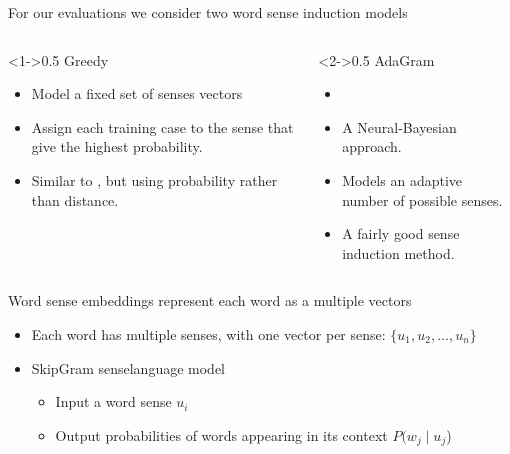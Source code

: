 \documentclass[dvipsnames]{beamer}
\begin{document}
\begin{frame}{For our evaluations we consider two word sense induction models}
	\begin{columns}[T]
		\begin{column}<1->{0.5\textwidth}
			\alert{Greedy}
			\begin{itemize}
				\item Model a \alert{fixed set} of senses vectors
				\item Assign each training case to the sense that give the \alert{highest probability}.
				\item Similar to \textcite{neelakantan2015efficient}, but using \alert{probability} rather than distance.
			\end{itemize}
		\end{column}
		\begin{column}<2->{0.5\textwidth}
			\alert{AdaGram}
			\begin{itemize}
				\item \textcite{AdaGrams}
				\item A Neural-Bayesian approach.
				\item Models an \alert{adaptive number} of possible senses.
				\item A fairly good sense induction method.
			\end{itemize}
		\end{column}	
	\end{columns}
\end{frame}

\begin{frame}{Word sense embeddings represent each word as a multiple vectors}
	\begin{itemize}
		\item Each word has multiple senses, with \alert{one vector per sense}: $\{u_1, u_2, ..., u_n\}$
		\item SkipGram \alert{sense}language model  \begin{itemize}
			\item \alert{Input} a word sense $u_i$
			\item \alert{Output} probabilities of words appearing in its context \alert{$P(w_j \mid u_j$)}
		\end{itemize}
	\end{itemize}
	\sentexample
\end{frame}
\end{document}
